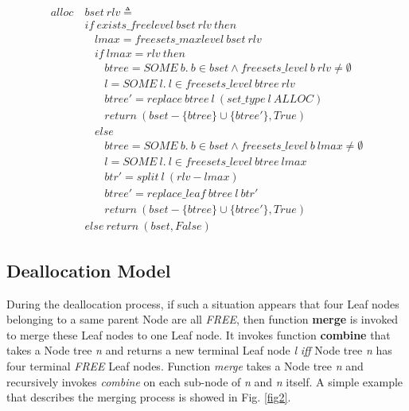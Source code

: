 \begin{definition} 
\end{definition}
\vspace{-7pt}
{\footnotesize
\begin{align*}
alloc\ &bset\ rlv \triangleq \\
&if\ exists\_freelevel\ bset\ rlv\ then \\
&\ \ \ \ lmax = freesets\_maxlevel\ bset\ rlv \\
&\ \ \ \ if\ lmax = rlv\ then \\
&\ \ \ \ \ \ \ \ btree = SOME\ b.\ b \in bset \wedge freesets\_level\ b\ rlv \ne \emptyset \\
&\ \ \ \ \ \ \ \ l = SOME\ l.\ l \in freesets\_level\ btree\ rlv \\
&\ \ \ \ \ \ \ \ btree' = replace\ btree\ l\ (set\_type\ l\ ALLOC) \\
&\ \ \ \ \ \ \ \ return\ (bset - \lbrace btree \rbrace \cup \lbrace btree' \rbrace, True) \\
&\ \ \ \ else \\
&\ \ \ \ \ \ \ \ btree = SOME\ b.\ b \in bset \wedge freesets\_level\ b\ lmax \ne \emptyset \\
&\ \ \ \ \ \ \ \ l = SOME\ l.\ l \in freesets\_level\ btree\ lmax \\
&\ \ \ \ \ \ \ \ btr' = split\ l\ (rlv - lmax) \\
&\ \ \ \ \ \ \ \ btree' = replace\_leaf\ btree\ l\ btr' \\
&\ \ \ \ \ \ \ \ return\ (bset - \lbrace btree \rbrace \cup \lbrace btree' \rbrace, True) \\
&else\ return\ (bset, False)
\end{align*}
}
\vspace{-17pt}

\subsection{Deallocation Model}
During the deallocation process, if such a situation appears that four Leaf nodes belonging to a same parent Node are all \emph{FREE}, then function \textbf{merge} is invoked to merge these Leaf nodes to one Leaf node. It invokes function \textbf{combine} that takes a Node tree \emph{n} and returns a new terminal Leaf node \emph{l} \emph{iff} Node tree \emph{n} has four terminal \emph{FREE} Leaf nodes. Function \emph{merge} takes a Node tree \emph{n} and recursively invokes \emph{combine} on each sub-node of \emph{n} and \emph{n} itself. A simple example that describes the merging process is showed in Fig. \ref{fig2}.

